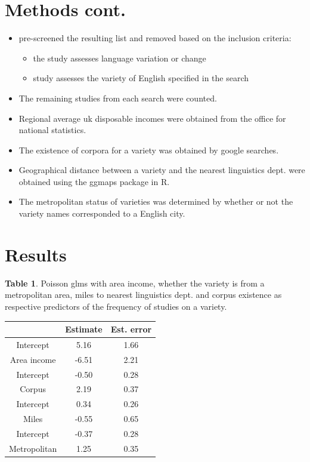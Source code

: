 \documentclass[a0paper,fleqn]{betterposter}
\begin{document}
{
	\section{Methods cont.}	
\begin{itemize}
	\item pre-screened the resulting list and removed based on the inclusion criteria:
	\begin{itemize}
		\item the study assesses language variation or change
		\item study assesses the variety of English specified in the search
	\end{itemize}
	\item The remaining studies from each search were counted.

	\item Regional average uk disposable incomes were obtained from the office for national statistics.
	\item The existence of corpora for a variety was obtained by google searches.
	\item Geographical distance between a variety and the nearest linguistics dept. were obtained using the ggmaps package in R.
	
	\item The metropolitan status of varieties was determined by whether or not the variety names corresponded to a English city.
\end{itemize}



\section{Results}

\vspace{1cm}
\textbf{Table 1}. Poisson glms with area income, whether the variety is from a metropolitan area, miles to nearest linguistics dept. and corpus existence as respective predictors of the frequency of studies on a variety.

\begin{tabular}{ c c c }
	 & Estimate & Est. error\\
	\hline
	 Intercept & 5.16 & 1.66	\\
	 Area income & -6.51 & 2.21\\
	\hline
	 Intercept & -0.50 & 0.28  \\
	 Corpus & 2.19 & 0.37 \\
	\hline
	 Intercept & 0.34  & 0.26  \\
	 Miles & -0.55  & 0.65  \\
	\hline
	 Intercept & -0.37 & 0.28 \\
	 Metropolitan & 1.25 & 0.35  \\
\hline
\end{tabular}



}
\end{document}
